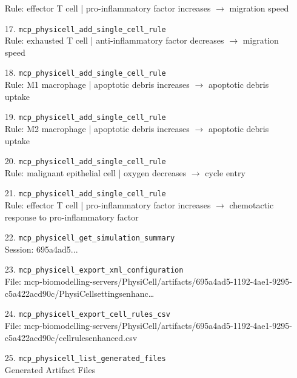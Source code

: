 \begin{enumerate}
\RaggedRight Rule: effector T cell | pro-inflammatory factor increases \ensuremath{\rightarrow} migration speed
\item[17.] \texttt{mcp\_\allowbreak{}physicell\_\allowbreak{}add\_\allowbreak{}single\_\allowbreak{}cell\_\allowbreak{}rule}
\hfill\\
\RaggedRight Rule: exhausted T cell | anti-inflammatory factor decreases \ensuremath{\rightarrow} migration speed
\item[18.] \texttt{mcp\_\allowbreak{}physicell\_\allowbreak{}add\_\allowbreak{}single\_\allowbreak{}cell\_\allowbreak{}rule}
\hfill\\
\RaggedRight Rule: M1 macrophage | apoptotic debris increases \ensuremath{\rightarrow} apoptotic debris uptake
\item[19.] \texttt{mcp\_\allowbreak{}physicell\_\allowbreak{}add\_\allowbreak{}single\_\allowbreak{}cell\_\allowbreak{}rule}
\hfill\\
\RaggedRight Rule: M2 macrophage | apoptotic debris increases \ensuremath{\rightarrow} apoptotic debris uptake
\item[20.] \texttt{mcp\_\allowbreak{}physicell\_\allowbreak{}add\_\allowbreak{}single\_\allowbreak{}cell\_\allowbreak{}rule}
\hfill\\
\RaggedRight Rule: malignant epithelial cell | oxygen decreases \ensuremath{\rightarrow} cycle entry
\item[21.] \texttt{mcp\_\allowbreak{}physicell\_\allowbreak{}add\_\allowbreak{}single\_\allowbreak{}cell\_\allowbreak{}rule}
\hfill\\
\RaggedRight Rule: effector T cell | pro-inflammatory factor increases \ensuremath{\rightarrow} chemotactic response to pro-inflammatory factor
\item[22.] \texttt{mcp\_\allowbreak{}physicell\_\allowbreak{}get\_\allowbreak{}simulation\_\allowbreak{}summary}
\hfill\\
\RaggedRight Session: 695a4ad5...
\item[23.] \texttt{mcp\_\allowbreak{}physicell\_\allowbreak{}export\_\allowbreak{}xml\_\allowbreak{}configuration}
\hfill\\
\RaggedRight File: mcp-biomodelling-servers/PhysiCell/artifacts/695a4ad5-1192-4ae1-9295-c5a422acd90c/PhysiCellsettingsenhanc\ldots{}
\item[24.] \texttt{mcp\_\allowbreak{}physicell\_\allowbreak{}export\_\allowbreak{}cell\_\allowbreak{}rules\_\allowbreak{}csv}
\hfill\\
\RaggedRight File: mcp-biomodelling-servers/PhysiCell/artifacts/695a4ad5-1192-4ae1-9295-c5a422acd90c/cellrulesenhanced.csv
\item[25.] \texttt{mcp\_\allowbreak{}physicell\_\allowbreak{}list\_\allowbreak{}generated\_\allowbreak{}files}
\hfill\\
\RaggedRight Generated Artifact Files
\end{enumerate}
\endgroup

